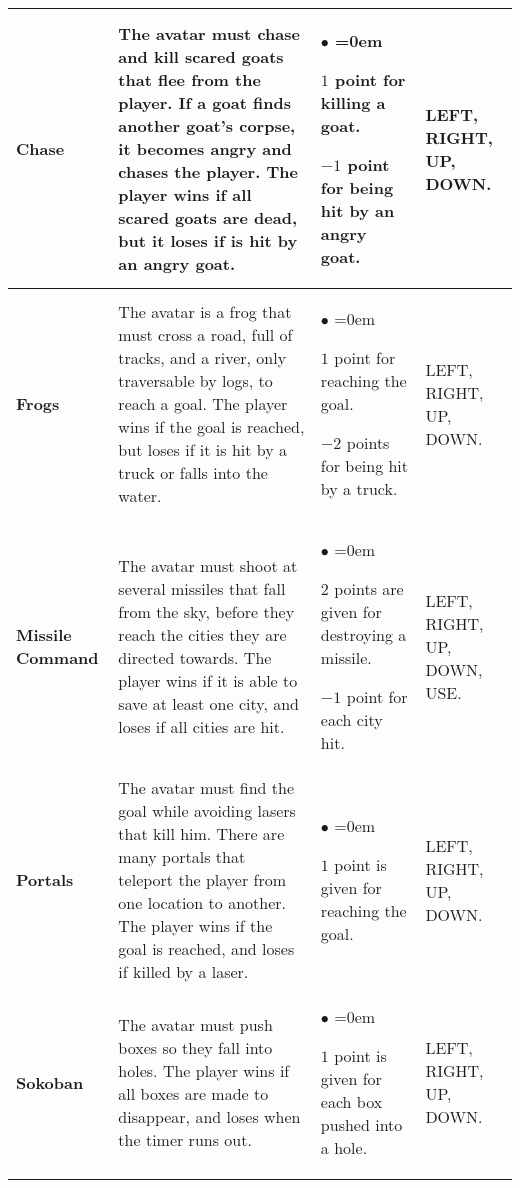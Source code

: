 \documentclass[conference]{IEEEtran}
\begin{document}
\begin{table*}[!t]
\begin{center}
\begin{tabular}{|m{1.4cm}|m{8cm}|m{5cm}|m{1cm}|}
\hline
\textbf{Chase} & The avatar must chase and kill scared goats that flee from the player. If a goat finds another goat's corpse, it becomes angry and chases the player. The player wins if all scared goats are dead, but it loses if is hit by an angry goat. & \begin{list}{$\bullet$}{\leftmargin=2pt \itemindent=0em} \item $1$ point for killing a goat. \item $-1$ point for being hit by an angry goat. \end{list} & LEFT, RIGHT, UP, DOWN.\\
\hline
\textbf{Frogs} & The avatar is a frog that must cross a road, full of tracks, and a river, only traversable by logs, to reach a goal.  The player wins if the goal is reached, but loses if it is hit by a truck or falls into the water. & \begin{list}{$\bullet$}{\leftmargin=2pt \itemindent=0em} \item $1$ point for reaching the goal. \item $-2$ points for being hit by a truck. \end{list} &  LEFT, RIGHT, UP, DOWN. \\
\hline
\textbf{Missile Command} & The avatar must shoot at several missiles that fall from the sky, before they reach the cities they are directed towards. The player wins if it is able to save at least one city, and loses if all cities are hit. &  \begin{list}{$\bullet$}{\leftmargin=2pt \itemindent=0em} \item $2$ points are given for destroying a missile. \item $-1$ point for each city hit. \end{list} & LEFT, RIGHT, UP, DOWN, USE.\\
\hline
\textbf{Portals} & The avatar must find the goal while avoiding lasers that kill him. There are many portals that teleport the player from one location to another. The player wins if the goal is reached, and loses if killed by a laser.& \begin{list}{$\bullet$}{\leftmargin=2pt \itemindent=0em} \item $1$ point is given for reaching the goal. \end{list} & LEFT, RIGHT, UP, DOWN.\\
\hline
\textbf{Sokoban} & The avatar must push boxes so they fall into holes. The player wins if all boxes are made to disappear, and loses when the timer runs out. & \begin{list}{$\bullet$}{\leftmargin=2pt \itemindent=0em} \item $1$ point is given for each box pushed into a hole. \end{list} & LEFT, RIGHT, UP, DOWN.\\

\end{tabular}
\end{center}
\end{table*}
\end{document}
